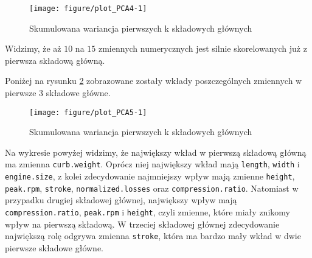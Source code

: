 \documentclass[12pt, a4paper]{article}\usepackage[]{graphicx}\usepackage[]{xcolor}
\makeatletter
\def\maxwidth{ %
  \ifdim\Gin@nat@width>\linewidth
    \linewidth
  \else
    \Gin@nat@width
  \fi
}
\newenvironment{knitrout}{}{} %
\makeatother
\begin{document}
\begin{knitrout}
\color{fgcolor}\begin{figure}[H]

{\centering \texttt{[image: figure/plot\_PCA4-1]} 

}

\caption[Skumulowana wariancja pierwszych k składowych głównych]{Skumulowana wariancja pierwszych k składowych głównych}\label{fig:plot_PCA4}
\end{figure}

\end{knitrout}

Widzimy, że aż $10$ na $15$ zmiennych numerycznych jest silnie skorelowanych już z pierwsza składową główną. 
\par Poniżej na rysunku \ref{fig:plot_PCA5} zobrazowane zostały wkłady poszczególnych zmiennych w pierwsze $3$ składowe główne.

\begin{knitrout}
\color{fgcolor}\begin{figure}[H]

{\centering \texttt{[image: figure/plot\_PCA5-1]} 

}

\caption[Skumulowana wariancja pierwszych k składowych głównych]{Skumulowana wariancja pierwszych k składowych głównych}\label{fig:plot_PCA5}
\end{figure}

\end{knitrout}
Na wykresie powyżej widzimy, że największy wkład w pierwszą składową główną ma zmienna \texttt{curb.weight}. Oprócz niej największy wkład mają \texttt{length}, 
\texttt{width} i \texttt{engine.size}, z kolei zdecydowanie najmniejszy wpływ mają zmienne \texttt{height}, \texttt{peak.rpm}, \texttt{stroke}, \texttt{normalized.losses} oraz \texttt{compression.ratio}. Natomiast w przypadku drugiej składowej głównej, największy wpływ mają \texttt{compression.ratio}, \texttt{peak.rpm} i \texttt{height}, czyli zmienne, które miały znikomy wpływ na pierwszą składową. W trzeciej składowej głównej zdecydowanie największą rolę odgrywa zmienna \texttt{stroke}, która ma bardzo mały wkład w dwie pierwsze składowe główne.
\end{document}
